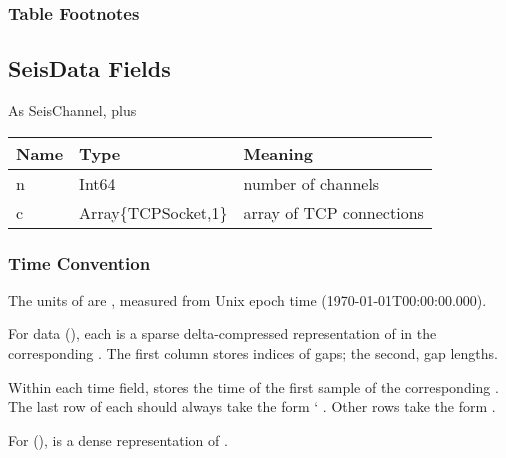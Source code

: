 \documentclass[letterpaper,11pt,english]{sphinxmanual}
\begin{document}
\subsubsection*{Table Footnotes}


\subsection{SeisData Fields}
\label{\detokenize{src/Appendices/seisdata_fields:seisdata-fields}}
As SeisChannel, plus


\begin{savenotes}\sphinxattablestart
\centering
\begin{tabulary}{\linewidth}[t]{|T|T|T|}
\hline
\sphinxstyletheadfamily 
Name
&\sphinxstyletheadfamily 
Type
&\sphinxstyletheadfamily 
Meaning
\\
\hline
n
&
Int64
&
number of channels
\\
\hline
c
&
Array\{TCPSocket,1\}
&
array of TCP connections
\\
\hline
\end{tabulary}
\par
\sphinxattableend\end{savenotes}


\subsubsection{Time Convention}
\label{\detokenize{src/Appendices/seisdata_fields:time-convention}}
The units of  are , measured from Unix epoch time
(1970-01-01T00:00:00.000).

For  data (), each  is a sparse
delta-compressed representation of  in the corresponding .
The first column stores indices of gaps; the second, gap lengths.

Within each time field,  stores the time of the first sample of the
corresponding . The last row of each  should always take the form {}`
. Other rows take the form .

For  (),  is a dense
representation of .
\end{document}
